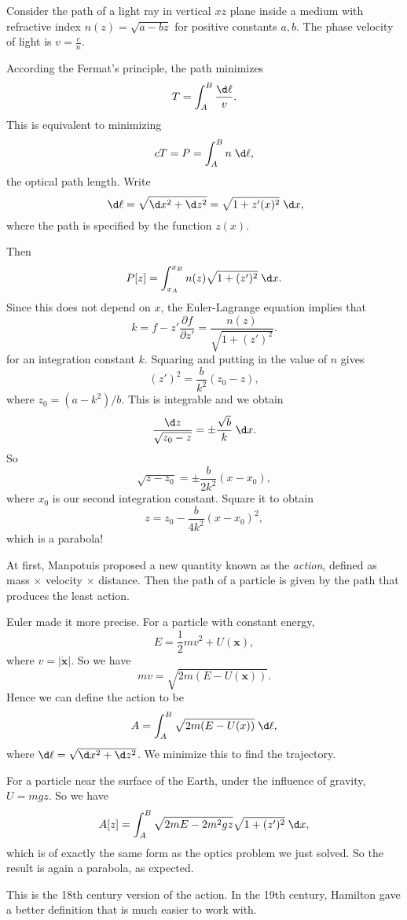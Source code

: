 \documentclass[a4paper]{article}
\begin{document}
\begin{eg}
  Consider the path of a light ray in vertical $xz$ plane inside a medium with refractive index $n(z) = \sqrt{a - bz}$ for positive constants $a, b$. The phase velocity of light is $v = \frac{c}{n}$.

  According the Fermat's principle, the path minimizes
  \[
    T = \int_A^B \frac{\d \ell}{v}.
  \]
  This is equivalent to minimizing
  \[
    cT = P = \int_A^B n\;\d \ell,
  \]
  the optical path length. Write 
  \[
    \;\d \ell = \sqrt{\d x^2 + \d z^2} = \sqrt{1 + z'(x)^2}\;\d x,
  \]
  where the path is specified by the function $z(x)$.

  Then
  \[
    P[z] = \int_{x_A}^{x_B}n(z)\sqrt{1 + (z')^2}\;\d x.
  \]
  Since this does not depend on $x$, the Euler-Lagrange equation implies that
  \[
    k = f - z'\frac{\partial f}{\partial z'} = \frac{n(z)}{\sqrt{1 + (z')^2}}.
  \]
  for an integration constant $k$. Squaring and putting in the value of $n$ gives
  \[
    (z')^2 = \frac{b}{k^2}(z_0 - z),
  \]
  where $z_0 = (a - k^2)/b$. This is integrable and we obtain
  \[
    \frac{\d z}{\sqrt{z_0 - z}} = \pm\frac{\sqrt{b}}{k}\;\d x.
  \]
  So
  \[ \sqrt{z - z_0} = \pm \frac{b}{2k^2}(x - x_0),
  \]
  where $x_0$ is our second integration constant. Square it to obtain
  \[
    z = z_0 - \frac{b}{4k^2}(x - x_0)^2,
  \]
  which is a parabola!
\end{eg}

\begin{eg}
  At first, Manpotuis proposed a new quantity known as the \emph{action}, defined as mass $\times$ velocity $\times$ distance. Then the path of a particle is given by the path that produces the least action.

  Euler made it more precise. For a particle with constant energy,
  \[
    E = \frac{1}{2} mv^2 + U(\mathbf{x}),
  \]
  where $v = |\dot{\mathbf{x}}|$. So we have
  \[
    mv = \sqrt{2m(E - U(\mathbf{x}))}.
  \]
  Hence we can define the action to be
  \[
    A = \int_A^B \sqrt{2m(E - U(x))}\;\d \ell,
  \]
  where $\d\ell = \sqrt{\d x^2 + \d z^2}$. We minimize this to find the trajectory.

  For a particle near the surface of the Earth, under the influence of gravity, $U = mgz$. So we have
  \[
    A[z] = \int_A^B \sqrt{2mE - 2m^2gz}\sqrt{1 + (z')^2}\;\d x,
  \]
  which is of exactly the same form as the optics problem we just solved. So the result is again a parabola, as expected.

  This is the 18th century version of the action. In the 19th century, Hamilton gave a better definition that is much easier to work with.
\end{eg}
\end{document}
